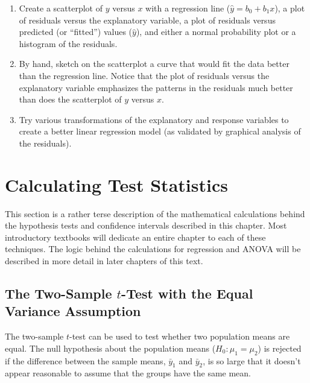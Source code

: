 \documentclass[
]{book}
\begin{document}
\begin{enumerate}
\def\labelenumi{\alph{enumi}.}
\item
  Create a scatterplot of \(y\) versus \(x\) with a regression line (\(\hat{y} = b_0 + b_1 x\)), a plot of residuals versus the explanatory variable, a plot of residuals versus predicted (or ``fitted'') values (\(\hat{y}\)), and either a normal probability plot or a histogram of the residuals.
\item
  By hand, sketch on the scatterplot a curve that would fit the data better than the regression line. Notice that the plot of residuals versus the explanatory variable emphasizes the patterns in the residuals much better than does the scatterplot of \(y\) versus \(x\).
\item
  Try various transformations of the explanatory and response variables to create a better linear regression model (as validated by graphical analysis of the residuals).
\end{enumerate}

\hypertarget{calculating-test-statistics}{%
\section{Calculating Test Statistics}\label{calculating-test-statistics}}

This section is a rather terse description of the mathematical calculations behind the hypothesis tests and confidence intervals described in this chapter. Most introductory textbooks will dedicate an entire chapter to each of these techniques. The logic behind the calculations for regression and ANOVA will be described in more detail in later chapters of this text.

\hypertarget{the-two-sample-t-test-with-the-equal-variance-assumption}{%
\subsection*{\texorpdfstring{The Two-Sample \(t\)-Test with the Equal Variance Assumption}{The Two-Sample t-Test with the Equal Variance Assumption}}\label{the-two-sample-t-test-with-the-equal-variance-assumption}}

The two-sample \(t\)-test can be used to test whether two population means are equal. The null hypothesis about the population means (\(H_0: \mu_1 = \mu_2\)) is rejected if the difference between the sample means, \(\bar{y}_1\) and \(\bar{y}_2\), is so large that it doesn't appear reasonable to assume that the groups have the same mean.
\end{document}
